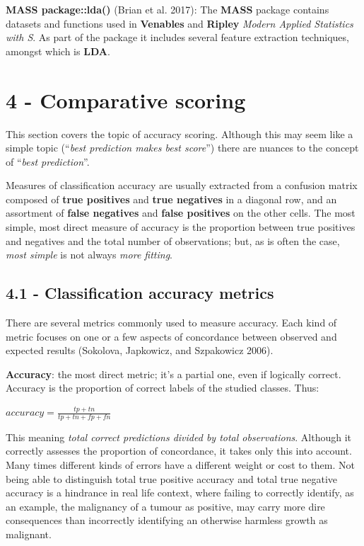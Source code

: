 \documentclass[]{article}
\begin{document}
\textbf{MASS package::lda()} (Brian et al. 2017): The \textbf{MASS}
package contains datasets and functions used in \textbf{Venables} and
\textbf{Ripley} \emph{Modern Applied Statistics with S}. As part of the
package it includes several feature extraction techniques, amongst which
is \textbf{LDA}.

\section{4 - Comparative scoring}\label{comparative-scoring}

This section covers the topic of accuracy scoring. Although this may
seem like a simple topic (``\emph{best prediction makes best score}'')
there are nuances to the concept of ``\emph{best prediction}''.

Measures of classification accuracy are usually extracted from a
confusion matrix composed of \textbf{true positives} and \textbf{true
negatives} in a diagonal row, and an assortment of \textbf{false
negatives} and \textbf{false positives} on the other cells. The most
simple, most direct measure of accuracy is the proportion between true
positives and negatives and the total number of observations; but, as is
often the case, \emph{most simple} is not always \emph{more fitting}.

\subsection{4.1 - Classification accuracy
metrics}\label{classification-accuracy-metrics}

There are several metrics commonly used to measure accuracy. Each kind
of metric focuses on one or a few aspects of concordance between
observed and expected results (Sokolova, Japkowicz, and Szpakowicz
2006).

\textbf{Accuracy}: the most direct metric; it's a partial one, even if
logically correct. Accuracy is the proportion of correct labels of the
studied classes. Thus:

\(accuracy = \frac{tp + tn}{tp + tn + fp + fn}\)

This meaning \emph{total correct predictions divided by total
observations}. Although it correctly assesses the proportion of
concordance, it takes only this into account. Many times different kinds
of errors have a different weight or cost to them. Not being able to
distinguish total true positive accuracy and total true negative
accuracy is a hindrance in real life context, where failing to correctly
identify, as an example, the malignancy of a tumour as positive, may
carry more dire consequences than incorrectly identifying an otherwise
harmless growth as malignant.
\end{document}

